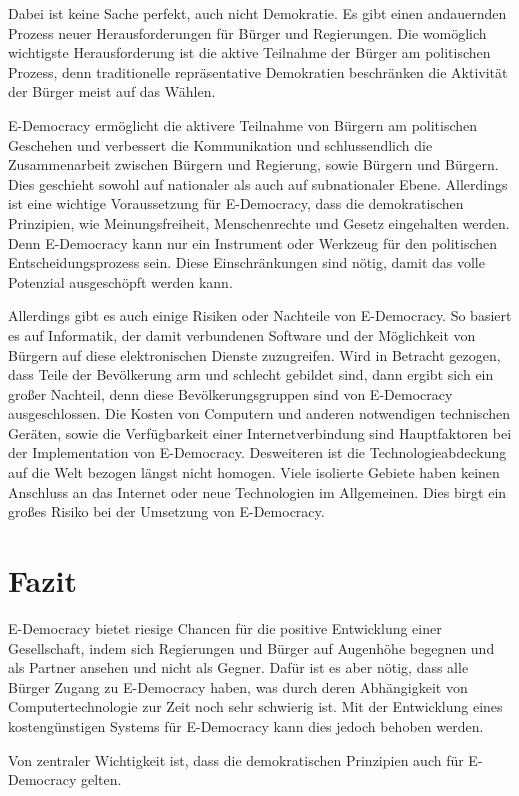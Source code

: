 \documentclass[12pt,twoside,ngerman]{scrartcl}
\theoremstyle{plain}
\theoremstyle{definition}
\theoremstyle{remark}
\begin{document}
	Dabei ist keine Sache perfekt, auch nicht Demokratie. Es gibt einen andauernden Prozess neuer Herausforderungen für Bürger und Regierungen. Die womöglich wichtigste Herausforderung ist die aktive Teilnahme der Bürger am politischen Prozess, denn traditionelle repräsentative Demokratien beschränken die Aktivität der Bürger meist auf das Wählen.\cite{Spirakis2010}
	
	E-Democracy ermöglicht die aktivere Teilnahme von Bürgern am politischen Geschehen und verbessert die Kommunikation und schlussendlich die Zusammenarbeit zwischen Bürgern und Regierung, sowie Bürgern und Bürgern. Dies geschieht sowohl auf nationaler als auch auf subnationaler Ebene. Allerdings ist eine wichtige Voraussetzung für E-Democracy, dass die demokratischen Prinzipien, wie Meinungsfreiheit, Menschenrechte und Gesetz eingehalten werden. Denn E-Democracy kann nur ein Instrument oder Werkzeug für den politischen Entscheidungsprozess sein. Diese Einschränkungen sind nötig, damit das volle Potenzial ausgeschöpft werden kann.\cite{Spirakis2010}
	
	Allerdings gibt es auch einige Risiken oder Nachteile von E-Democracy. So basiert es auf Informatik, der damit verbundenen Software und der Möglichkeit von Bürgern auf diese elektronischen Dienste zuzugreifen. Wird in Betracht gezogen, dass Teile der Bevölkerung arm und schlecht gebildet sind, dann ergibt sich ein großer Nachteil, denn diese Bevölkerungsgruppen sind von E-Democracy ausgeschlossen. Die Kosten von Computern und anderen notwendigen technischen Geräten, sowie die Verfügbarkeit einer Internetverbindung sind Hauptfaktoren bei der Implementation von E-Democracy. Desweiteren ist die Technologieabdeckung auf die Welt bezogen längst nicht homogen. Viele isolierte Gebiete haben keinen Anschluss an das Internet oder neue Technologien im Allgemeinen. Dies birgt ein großes Risiko bei der Umsetzung von E-Democracy.\cite{Spirakis2010}
	
\section{Fazit}
\label{sec:concl}

	E-Democracy bietet riesige Chancen für die positive Entwicklung einer Gesellschaft, indem sich Regierungen und Bürger auf Augenhöhe begegnen und als Partner ansehen und nicht als Gegner.
	Dafür ist es aber nötig, dass alle Bürger Zugang zu E-Democracy haben, was durch deren Abhängigkeit von Computertechnologie zur Zeit noch sehr schwierig ist. Mit der Entwicklung eines kostengünstigen Systems für E-Democracy kann dies jedoch behoben werden.
	
	Von zentraler Wichtigkeit ist, dass die demokratischen Prinzipien auch für E-Democracy gelten.

%
%
\clearpage


\end{document}
